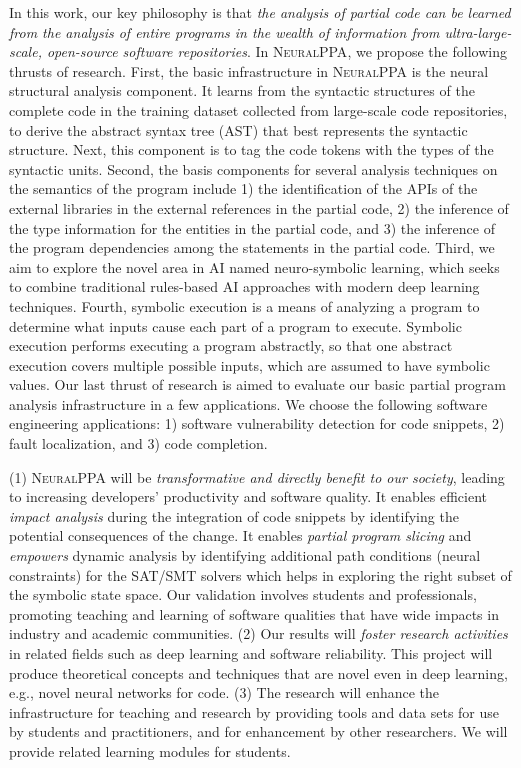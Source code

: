 \documentclass[11pt]{article}
\newcommand{\tool}{\textsc{NeuralPPA}\xspace}
\begin{document}
  In this work, our key philosophy
is that {\em the analysis of partial code can be learned from the
  analysis of entire programs in the wealth of information from
  ultra-large-scale, open-source software repositories}.  In {\tool},
we propose the following thrusts of research. First, the basic
infrastructure in {\tool} is the neural structural analysis component.
It learns from the syntactic structures of the complete code in the
training dataset collected from large-scale code repositories, to
derive the abstract syntax tree (AST) that best represents the
syntactic structure. Next, this component is to tag the code tokens
with the types of the syntactic units.  Second, the basis components
for several analysis techniques on the semantics of the program
include 1) the identification of the APIs of the external libraries in
the external references in the partial code, 2) the inference of the
type information for the entities in the partial code, and 3) the
inference of the program dependencies among the statements in the
partial code. Third, we aim to explore the novel area in AI named
neuro-symbolic learning, which seeks to combine traditional
rules-based AI approaches with modern deep learning
techniques. Fourth, symbolic execution is a means of analyzing a
program to determine what inputs cause each part of a program to
execute. Symbolic execution performs executing a program abstractly,
so that one abstract execution covers multiple possible inputs, which
are assumed to have symbolic values. Our last thrust of research is
aimed to evaluate our basic partial program analysis infrastructure in
a few applications. We choose the following software engineering
applications: 1) software vulnerability detection for code snippets,
2) fault localization, and 3) code completion.

  (1) {\tool} will be {\em
  transformative and directly benefit to our society}, leading to
increasing developers’ productivity and software quality. It enables
efficient \textit{impact analysis} during the integration of code
snippets by identifying the potential consequences of the change. It
enables \textit{partial program slicing} and \emph{empowers} dynamic
analysis by identifying additional path conditions (neural
constraints) for the SAT/SMT solvers which helps in exploring the
right subset of the symbolic state space.
%
Our validation involves students and professionals, promoting teaching
and learning of software qualities that have wide impacts in industry
and academic communities. (2) Our results will {\em foster research
  activities} in related fields such as deep learning and software
reliability. This project will produce theoretical concepts and
techniques that are novel even in deep learning, e.g., novel neural
networks for code. (3) The research will enhance the infrastructure
for teaching and research by providing tools and data sets for use by
students and practitioners, and for enhancement by other
researchers. We will provide related learning modules for students.
\end{document}
